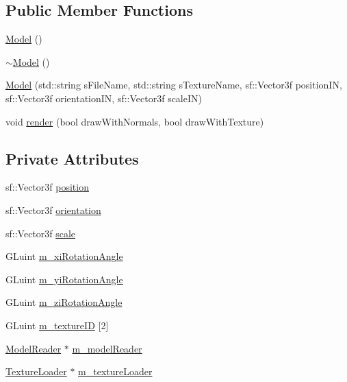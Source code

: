 \subsection*{Public Member Functions}
\begin{DoxyCompactItemize}
\item 
\hyperlink{class_model_ae3b375de5f6df4faf74a95d64748e048}{Model} ()
\item 
\hyperlink{class_model_ad6ebd2062a0b823db841a0b88baac4c0}{$\sim$\+Model} ()
\item 
\hyperlink{class_model_a76f8ab6b607136cf845617d0c02d4ce9}{Model} (std\+::string s\+File\+Name, std\+::string s\+Texture\+Name, sf\+::\+Vector3f position\+IN, sf\+::\+Vector3f orientation\+IN, sf\+::\+Vector3f scale\+IN)
\item 
void \hyperlink{class_model_a4be6c139cfb3b8bc2903cd536f3b16fb}{render} (bool draw\+With\+Normals, bool draw\+With\+Texture)
\end{DoxyCompactItemize}
\subsection*{Private Attributes}
\begin{DoxyCompactItemize}
\item 
sf\+::\+Vector3f \hyperlink{class_model_a2f25a152b6212faf7d23e6d6ab103d61}{position}
\item 
sf\+::\+Vector3f \hyperlink{class_model_a94eb6111227ec3db203681abd21ebeca}{orientation}
\item 
sf\+::\+Vector3f \hyperlink{class_model_aac1cda61a954d28aa2ee94a1b23de4a9}{scale}
\item 
G\+Luint \hyperlink{class_model_ac0b7f3944641754dba82add1bc4604fc}{m\+\_\+xi\+Rotation\+Angle}
\item 
G\+Luint \hyperlink{class_model_aacf906903bfaa80cb02c46a299016f5e}{m\+\_\+yi\+Rotation\+Angle}
\item 
G\+Luint \hyperlink{class_model_a70be5d2acec40543ec2b9186dfc7cb43}{m\+\_\+zi\+Rotation\+Angle}
\item 
G\+Luint \hyperlink{class_model_a23d182da28544aa34e44752eabaa0422}{m\+\_\+texture\+ID} \mbox{[}2\mbox{]}
\item 
\hyperlink{class_model_reader}{Model\+Reader} $\ast$ \hyperlink{class_model_a3247a4733aa6155e6ed8649cca51d658}{m\+\_\+model\+Reader}
\item 
\hyperlink{class_texture_loader}{Texture\+Loader} $\ast$ \hyperlink{class_model_aade88da2d54d5fa74bd941a1b6f92cc3}{m\+\_\+texture\+Loader}
\end{DoxyCompactItemize}


